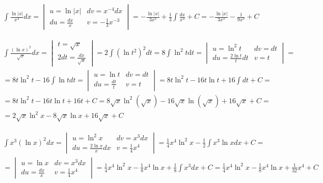 \begin{gather*}
  \int \frac{\ln|x|}{x^4}dx
  = \begin{vmatrix}
    u=\ln|x| & dv=x^{-4}dx \\
    du=\frac{dx}{x} & v=-\frac{1}{3}x^{-3}
  \end{vmatrix}
  = -\frac{\ln|x|}{3x^3} + \frac{1}{3} \int \frac{dx}{x^4} + C
  = -\frac{\ln|x|}{3x^3} - \frac{1}{9x^3} +C
\end{gather*}


\begin{gather*}
  \int \frac{(\ln x)^2}{\sqrt{x}}dx =
  \begin{vmatrix}
    t=\sqrt{x} \\
    2dt=\frac{dx}{\sqrt{x}}
  \end{vmatrix}
  = 2 \int (\ln t^2)^2dt = 8\int \ln^2{t} \mbox{d}t =
  \begin{vmatrix}
    u=\ln^2t & dv=dt \\
    du=\frac{2\ln t}{t}dt & v=t
  \end{vmatrix} = \\
  = 8t\ln^2t - 16\int \ln t dt =
  \begin{vmatrix}
    u=\ln t & dv=dt \\
    du=\frac{dt}{t} & v=t
  \end{vmatrix}
  = 8t\ln^2t - 16t\ln t + 16\int dt + C = \\
  = 8t\ln^2t - 16t\ln t + 16t + C
  = 8\sqrt{x}\ln^2(\sqrt{x}) - 16\sqrt{x}\ln (\sqrt{x}) + 16\sqrt{x} +C = \\
  = 2\sqrt{x}\ln^2x - 8\sqrt{x}\ln x + 16\sqrt{x} + C
\end{gather*}



\begin{gather*}
  \int x^3(\ln x)^2dx =
  \begin{vmatrix}
    u=\ln^2x & dv=x^3dx \\
    du=\frac{2\ln x}{x}dx & v=\frac{1}{4}x^4
  \end{vmatrix}
  = \frac{1}{4}x^4\ln^2x - \frac{1}{2}\int x^3\ln x dx + C = \\
  = \begin{vmatrix}
    u=\ln x & dv=x^3dx \\
    du=\frac{dx}{x} & v=\frac{1}{4}x^4
  \end{vmatrix}
  = \frac{1}{4}x^4\ln^2x - \frac{1}{8}x^4\ln x + \frac{1}{8} \int x^3 dx + C
  = \frac{1}{4}x^4\ln^2x - \frac{1}{8}x^4\ln x + \frac{1}{32}x^4+C
\end{gather*}



